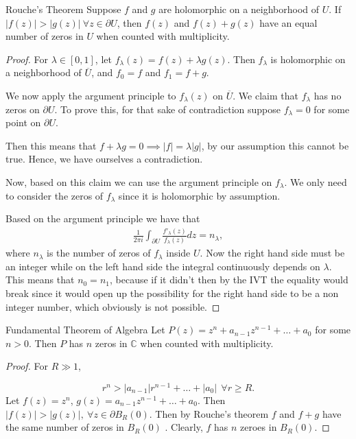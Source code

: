\documentclass{article}
\begin{document}
\begin{thrm}{Rouche's Theorem}{}
Suppose \( f \) and \( g \) are holomorphic on a neighborhood of \( U \). If \( |f(z)| > |g(z)| \ \forall z\in \partial U \), then \( f(z) \) and \( f(z) + g(z) \) have an equal number of zeros in \( U \) when counted with multiplicity. 

\tcbline 

\begin{proof}
For \( \lambda \in \left[ 0,1 \right]  \), let \( f_\lambda (z) = f(z) + \lambda g(z) \). 
Then \( f_\lambda  \) is holomorphic on a neighborhood of \( \overline{U}  \), and \( f_0 = f \) and \( f_1 = f + g \).

We now apply the argument principle to \( f_\lambda (z)  \) on \( \overline{U}  \). 
We claim that \( f_\lambda  \) has no zeros on \(  \partial U\).
To prove this, for that sake of contradiction suppose \( f_\lambda = 0 \) for some point on \( \partial U \). 

Then this means that \( f +\lambda g = 0 \implies |f| = \lambda |g|\), by our assumption this cannot be true. Hence, we have ourselves a contradiction. 

Now, based on this claim we can use the argument principle on \( f_\lambda  \). We only need to consider the zeros of \( f_\lambda  \) since it is holomorphic by assumption. 

Based on the argument principle we have that 
\begin{align*}
    \frac{1}{2\pi i}\int _{\partial U}\frac{f'_\lambda (z)}{f _\lambda (z)}dz = n_\lambda,  
\end{align*}
where \( n_\lambda  \)  is the number of zeros of \( f_\lambda  \) inside \( U \). Now the right hand side must be an integer while on the left hand side the integral continuously depends on \( \lambda  \). This means that \( n_0 = n_1 \), because if it didn't then by the IVT the equality would break since it would open up the possibility for the right hand side to be a non integer number, which obviously is not possible. 
\end{proof}

\end{thrm}

\begin{cor}{Fundamental Theorem of Algebra}{}
Let \( P(z) = z^n + a_{n - 1} z^{n - 1} + \dots + a_0  \) for some \( n > 0 \). 
Then \( P \) has \( n \) zeros in \( \mathbb{C}  \) when counted with multiplicity. 

\tcbline

\begin{proof}
For \( R \gg 1 \),

\[
  r^n > |a_{n - 1} |r^{n- 1}+ \dots + |a_0| \ \ \forall r \geq R   .
\]
Let \( f(z) = z^n \), \( g(z) = a_{n- 1}z^{n- 1} + \dots + a_0   \). Then \( |f(z)| > |g(z)|, \ \forall z \in \partial B_R(0) \). Then by Rouche's theorem \( f \) and \( f + g  \) have the same number of zeros in \( B_R(0)\) . Clearly, \( f \) has \( n \) zeroes in \( B_R(0) \). 
\end{proof}

\end{cor}
\end{document}
